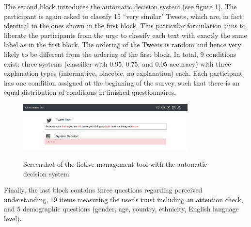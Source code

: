 The second block introduces the automatic decision system (see figure \ref{fig:survey_tools2}). The participant is again asked to classify 15 ``very similar" Tweets, which are, in fact, identical to the ones shown in the first block. This particular formulation aims to liberate the participants from the urge to classify each text with exactly the same label as in the first block. The ordering of the Tweets is random and hence very likely to be different from the ordering of the first block. In total, 9 conditions exist: three systems (classifier with 0.95, 0.75, and 0.05 accuracy) with three explanation types (informative, placebic, no explanation) each. Each participant has one condition assigned at the beginning of the survey, such that there is an equal distribution of conditions in finished questionnaires. \newline
\begin{figure} [H]
	\centering
	\includegraphics[width=0.8\textwidth]{img/pg_5_13.PNG}\\
	\caption{Screenshot of the fictive management tool with the automatic decision system}
	\label{fig:survey_tools2}
\end{figure}
Finally, the last block contains three questions regarding perceived understanding, 19 items measuring the user's trust including an attention check, and 5 demographic questions (gender, age, country, ethnicity, English language level).

